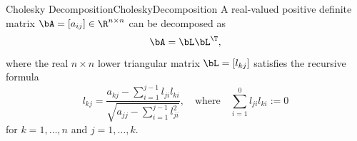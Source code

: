 \begin{thm}{Cholesky Decomposition}{CholeskyDecomposition}
	A real-valued positive definite matrix $\bA = [a_{ij}] \in \R^{n \times n}$ can be decomposed as
	\begin{equation}
		\label{CholeskyFactorization}
		\bA = \bL \bL^\T,
	\end{equation}
	where the real $n \times n$ lower triangular matrix $\bL = [l_{kj}]$ satisfies the recursive formula
	\begin{equation}
		\label{CholeskyRecursiveFormula}
		l_{kj} = \frac{a_{kj} - \sum_{i=1}^{j-1} l_{ji} l_{ki}}{\sqrt{a_{jj} - \sum_{i=1}^{j-1} l_{ji}^2}}, \quad \text{where} \quad \sum_{i=1}^0 l_{ji} l_{ki} := 0
	\end{equation}
	for $k = 1, \dots, n$ and $j = 1, \dots, k$.
\end{thm}


